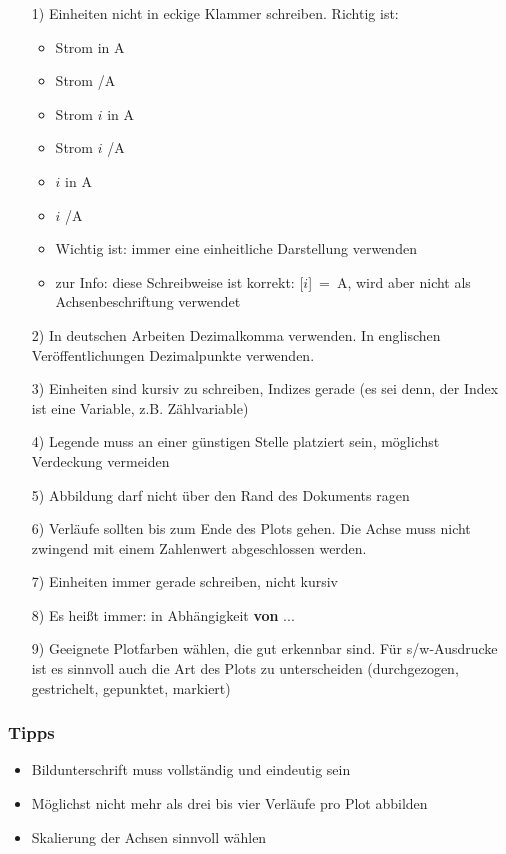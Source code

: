 \begin{enumerate}
	\item[1)] Einheiten nicht in eckige Klammer schreiben. Richtig ist:
			\begin{itemize}
				\item Strom in A
				\item Strom /A
				\item Strom $i$ in A
				\item Strom $i$ /A
				\item $i$ in A
				\item $i$ /A
				\item Wichtig ist: immer eine einheitliche Darstellung verwenden
				\item zur Info: diese Schreibweise ist korrekt: [$i$]~=~A, wird aber nicht als Achsenbeschriftung verwendet
			\end{itemize}
	\item[2)] In deutschen Arbeiten Dezimalkomma verwenden. In englischen Veröffentlichungen Dezimalpunkte verwenden.
	\item[3)] Einheiten sind kursiv zu schreiben, Indizes gerade (es sei denn, der Index ist eine Variable, z.B. Zählvariable)
	\item[4)] Legende muss an einer günstigen Stelle platziert sein, möglichst Verdeckung vermeiden
	\item[5)] Abbildung darf nicht über den Rand des Dokuments ragen
	\item[6)] Verläufe sollten bis zum Ende des Plots gehen. Die Achse muss nicht zwingend mit einem Zahlenwert abgeschlossen werden.
	\item[7)] Einheiten immer gerade schreiben, nicht kursiv
	\item[8)] Es heißt immer: in Abhängigkeit \textbf{von} ...
	\item[9)] Geeignete Plotfarben wählen, die gut erkennbar sind. Für s/w-Ausdrucke ist es sinnvoll auch die Art des Plots zu unterscheiden (durchgezogen, gestrichelt, gepunktet, markiert)
\end{enumerate}

\subsubsection{Tipps}

\begin{itemize}
	\item Bildunterschrift muss vollständig und eindeutig sein
	\item Möglichst nicht mehr als drei bis vier Verläufe pro Plot abbilden
	\item Skalierung der Achsen sinnvoll wählen
\end{itemize}